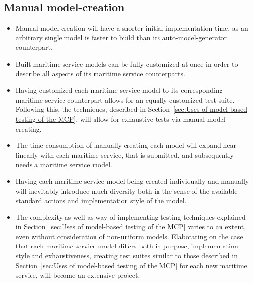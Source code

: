 \subsection{Manual model-creation}
\begin{itemize}
  \item Manual model creation will have a shorter initial implementation time, as an arbitrary single model is faster to build than its auto-model-generator counterpart. 
  \item Built maritime service models can be fully customized at once in order to describe all aspects of its maritime service counterparts.
  \item Having customized each maritime service model to its corresponding maritime service counterpart allows for an equally customized test suite. Following this, the techniques, described in Section~\ref{sec:Uses of model-based testing of the MCP}, will allow for exhaustive tests via manual model-creating.
\end{itemize}
\begin{itemize}
  \item The time consumption of manually creating each model will expand near-linearly with each maritime service, that is submitted, and subsequently needs a maritime service model. 
  \item Having each maritime service model being created individually and manually will inevitably introduce much diversity both in the sense of the available standard actions and implementation style of the model.
  \item The complexity as well as way of implementing testing techniques explained in Section~\ref{sec:Uses of model-based testing of the MCP} varies to an extent, even without consideration of non-uniform models. Elaborating on the case that each maritime service model differs both in purpose, implementation style and exhaustiveness, creating test suites similar to those described in Section~\ref{sec:Uses of model-based testing of the MCP} for each new maritime service, will become an extensive project.
\end{itemize}\newpage
